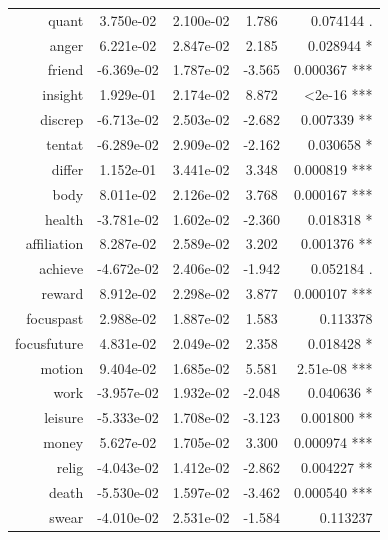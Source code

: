 \documentclass[bsc,frontabs,twoside,singlespacing,parskip,deptreport]{infthesis}
\begin{document}
\begin{table}[p]
{\begin{tabular}{rcccr}
quant       & 3.750e-02  & 2.100e-02  & 1.786   & 0.074144 .                          \\
anger       & 6.221e-02  & 2.847e-02  & 2.185   & 0.028944 *                          \\
friend      & -6.369e-02 & 1.787e-02  & -3.565  & 0.000367 ***                        \\
insight     & 1.929e-01  & 2.174e-02  & 8.872   & \textless 2e-16 ***                 \\
discrep     & -6.713e-02 & 2.503e-02  & -2.682  & 0.007339 **                         \\
tentat      & -6.289e-02 & 2.909e-02  & -2.162  & 0.030658 *                          \\
differ      & 1.152e-01  & 3.441e-02  & 3.348   & 0.000819 ***                        \\
body        & 8.011e-02  & 2.126e-02  & 3.768   & 0.000167 ***                        \\
health      & -3.781e-02 & 1.602e-02  & -2.360  & 0.018318 *                          \\
affiliation & 8.287e-02  & 2.589e-02  & 3.202   & 0.001376 **                         \\
achieve     & -4.672e-02 & 2.406e-02  & -1.942  & 0.052184 .                          \\
reward      & 8.912e-02  & 2.298e-02  & 3.877   & 0.000107 ***                        \\
focuspast   & 2.988e-02  & 1.887e-02  & 1.583   & 0.113378                            \\
focusfuture & 4.831e-02  & 2.049e-02  & 2.358   & 0.018428 *                          \\
motion      & 9.404e-02  & 1.685e-02  & 5.581   & 2.51e-08 ***                        \\
work        & -3.957e-02 & 1.932e-02  & -2.048  & 0.040636 *                          \\
leisure     & -5.333e-02 & 1.708e-02  & -3.123  & 0.001800 **                         \\
money       & 5.627e-02  & 1.705e-02  & 3.300   & 0.000974 ***                        \\
relig       & -4.043e-02 & 1.412e-02  & -2.862  & 0.004227 **                         \\
death       & -5.530e-02 & 1.597e-02  & -3.462  & 0.000540 ***                        \\
swear       & -4.010e-02 & 2.531e-02  & -1.584  & 0.113237                            \\

\end{tabular}}
\end{table}
\end{document}
